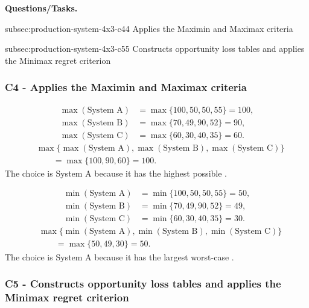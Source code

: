 	\textbf{Questions/Tasks.}
	\begin{enumerate}
		\CriterionTask
		{subsec:production-system-4x3-c4}{4}
		{Applies the Maximin and Maximax criteria}

		\CriterionTask
		{subsec:production-system-4x3-c5}{5}
		{Constructs opportunity loss tables and applies the Minimax regret criterion}
	\end{enumerate}
	
	\subsubsection*{C4 - Applies the Maximin and Maximax criteria}
	\label{subsec:production-system-4x3-c4}
	
	\[
	\begin{aligned}
		\max(\text{System A}) &= \max\{100,50,50,55\}=100,\\
		\max(\text{System B}) &= \max\{70,49,90,52\}=90,\\
		\max(\text{System C}) &= \max\{60,30,40,35\}=60.
	\end{aligned}
	\]
	\[
	\begin{aligned}
		&\max\{\max(\text{System A}),\max(\text{System B}),
		\max(\text{System C})\}\\
		&\qquad=\max\{100,90,60\}
		=100.
	\end{aligned}
	\]
	The  choice is System A because it has the highest possible .
	
	\[
	\begin{aligned}
		\min(\text{System A}) &= \min\{100,50,50,55\}=50,\\
		\min(\text{System B}) &= \min\{70,49,90,52\}=49,\\
		\min(\text{System C}) &= \min\{60,30,40,35\}=30.
	\end{aligned}
	\]
	\[
	\begin{aligned}
		&\max\{\min(\text{System A}),\min(\text{System B}),
		\min(\text{System C})\}\\
		&\qquad=\max\{50,49,30\}
		=50.
	\end{aligned}
	\]
	The  choice is System A because it has the largest worst-case .
	
	\subsubsection*{C5 - Constructs opportunity loss tables and applies the Minimax regret criterion}
	\label{subsec:production-system-4x3-c5}
	
